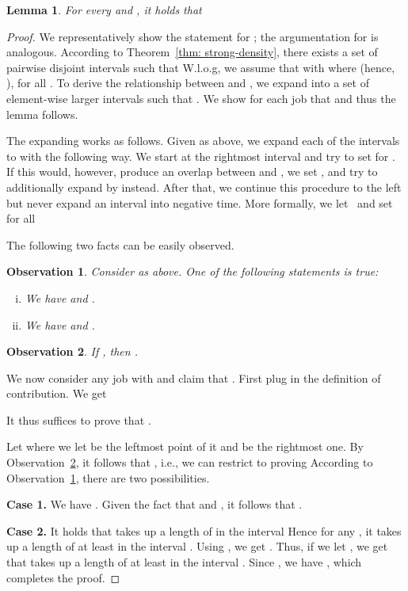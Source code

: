 \documentclass[letterpaper,11pt]{article}
\newtheorem{lemma}{Lemma}
\newtheorem{observation}{Observation}
\begin{document}
\begin{lemma}\label{lemma:laxity-release-increase}
For every  and , it holds that

\end{lemma}
\begin{proof}
We representatively show the statement for ; the argumentation for  is analogous. According to Theorem~\ref{thm: strong-density}, there exists a set of  pairwise disjoint intervals  such that 
W.l.o.g, we assume that  with  where  (hence, ), for all . To derive the relationship between  and , we expand  into a set of element-wise larger intervals  such that . We show for each job  that  and thus the lemma follows.

The expanding works as follows. Given  as above, we expand each of the intervals  to  with  the following way. We start at the rightmost interval  and try to set  for . If this would, however, produce an overlap between  and , we set ,  and try to additionally expand  by  instead. After that, we continue this procedure to the left but never expand an interval into negative time. More formally, we let~  and set for all  

The following two facts can be easily observed.

\begin{observation}\label{lemma:expand-length}
Consider  as above. One of the following statements is true:
\begin{enumerate}[(i)]
  \item We have  and .
  \item We have  and .
\end{enumerate}
\end{observation}

\begin{observation}\label{lemma:expand-subintervals}
If , then .
\end{observation}






We now consider any job  with  and claim that . First plug in the definition of contribution. We get

It thus suffices to prove that .

Let  where we let  be the leftmost point of it and  be the rightmost one. By Observation~\ref{lemma:expand-subintervals}, it follows that , i.e., we can restrict to proving  According to Observation~\ref{lemma:expand-length}, there are two possibilities. 

\noindent\textbf{Case 1.} We have . Given the fact that  and , it follows that . 

\noindent\textbf{Case 2.} It holds that  takes up a length of  in the interval  Hence for any , it takes up a length of at least  in the interval . Using , we get . Thus, if we let , we get that  takes up a length of at least  in the interval . Since , we have , which completes the proof.
\end{proof}
\end{document}
